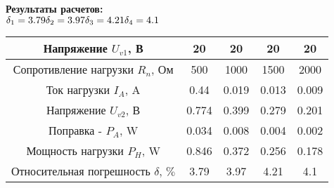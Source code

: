\textbf{Результаты расчетов:}\\
$\delta_{1}=3.79\\
\delta_{2}=3.97\\
\delta_{3}=4.21\\
\delta_{4}=4.1$
\\
\vspace{1cm}
\begin{table}[h!]
	\begin{tabular}{|c|c|c|c|c|}
		\hline
		Напряжение $U_{v1}$, В 				&	20	&	20	&	20	&	20	\\
		\hline
		Сопротивление нагрузки $R_{n}$, Ом	&	500	&	1000&	1500&	2000\\
		\hline
		Ток нагрузки $I_{A}$, A 			&	0.44&  	0.019& 	0.013& 	0.009\\
		\hline
		Напряжение $U_{v2}$, В 				&	0.774&	0.399&	0.279&	0.201\\
		\hline
		Поправка - $P_{A}$, W				& 	0.034&	0.008&	0.004&	0.002\\
		\hline
		Мощность нагрузки $P_{H}$, W		&	0.846&	0.372&	0.256&	0.178\\
		\hline
		Относительная погрешность $\delta$, $\%$ & 	3.79&	3.97&	4.21&	4.1\\
		\hline	
	\end{tabular}
\end{table}

